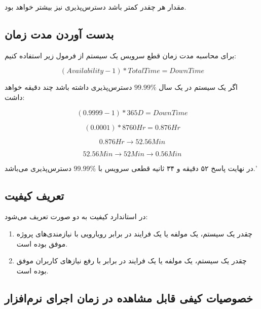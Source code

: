مقدار  هر چقدر کمتر باشد دسترس‌پذیری نیز بیشتر خواهد بود.

\subsection{بدست آوردن مدت زمان }

برای محاسبه مدت زمان قطع سرویس یک سیستم از فرمول زیر استفاده کنیم:

\begin{equation}
    (Availability - 1) * Total Time = DownTime
\end{equation}

اگر یک سیستم در یک سال $99.99\%$ دسترس‌پذیری داشته باشد چند دقیقه 
خواهد داشت:

\begin{equation}
    (0.9999 - 1) * 365D = Down Time
\end{equation}

\begin{equation}
    (0.0001) * 8760Hr = 0.876Hr
\end{equation}

\begin{equation}
    0.876Hr \rightarrow 52.56Min
\end{equation}

\begin{equation}
    52.56Min \rightarrow 52 Min \rightarrow 0.56Min
\end{equation}

در نهایت پاسخ ۵۲ دقیقه و ۳۴ ثانیه قطعی سرویس با $99.99\%$ دسترس‌پذیری می‌باشد.'

\subsection{تعریف کیفیت}

در استاندارد  کیفیت به دو صورت تعریف می‌شود:

\begin{enumerate}
    \item چقدر یک سیستم، یک مولفه یا یک فرایند در برابر رویارویی با نیازمندی‌های
    پروژه موفق بوده است.
    \item چقدر یک سیستم، یک مولفه یا یک فرایند در برابر با رفع نیاز‌های کاربران
    موفق بوده است.
\end{enumerate}

\subsection{خصوصیات کیفی قابل مشاهده در زمان اجرای نرم‌افزار}

